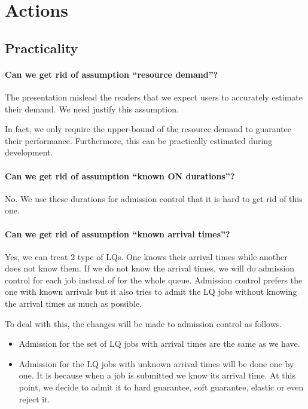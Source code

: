 \section{Actions}

\subsection{Practicality}

\paragraph{Can we get rid of assumption ``resource demand''?} The presentation mislead the readers that we expect users to accurately estimate their demand. We need justify this assumption.

In fact, we only require the upper-bound of the resource demand to guarantee their performance. Furthermore, this can be practically estimated during development.

\paragraph{Can we get rid of assumption ``known ON durations''?} No. We use these durations for admission control that it is hard to get rid of this one.

\paragraph{Can we get rid of assumption ``known arrival times''?} Yes, we can treat 2 type of LQs. One knows their arrival times while another does not know them. If we do not know the arrival times, we will do admission control for each job instead of for the whole queue. Admission control prefers the one with known arrivals but it also tries to admit the LQ jobs without knowing the arrival times as much as possible. 

To deal with this, the changes will be made to admission control as follows.
\begin{itemize}
	\item Admission for the set of LQ jobs with arrival times are the same as we have.
	\item Admission for the LQ jobs with unknown arrival times will be done one by one. It is because when a job is submitted we know its arrival time. At this point, we decide to admit it to hard guarantee, soft guarantee, elastic or even reject it.
\end{itemize}

